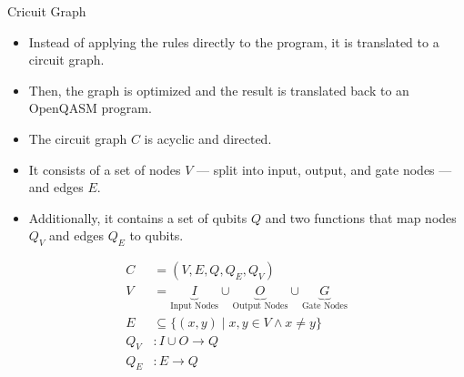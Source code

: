 \begin{frame}{Cricuit Graph}
    \begin{itemize}
        \item Instead of applying the rules directly to the program, it is translated to a circuit graph.
        \item Then, the graph is optimized and the result is translated back to an OpenQASM program.
        \item The circuit graph $C$ is acyclic and directed.
        \item It consists of a set of nodes $V$ --- split into input, output, and gate nodes --- and edges $E$.
        \item Additionally, it contains a set of qubits $Q$ and two functions that map nodes $Q_V$ and edges $Q_E$ to qubits.
    \end{itemize}
    \vfill
    \begin{align*}
        C &= (V, E, Q, Q_E, Q_V)\\
        V &= \underbrace{I}_{\text{Input Nodes}} \cup \underbrace{O}_{\text{Output Nodes}} \cup \underbrace{G}_{\text{Gate Nodes}}\\
        E &\subseteq \{ (x, y) \mid x,y \in V \land x \neq y \}\\
        Q_V &: I \cup O \to Q \\
        Q_E &: E \to Q
    \end{align*}
\end{frame}

